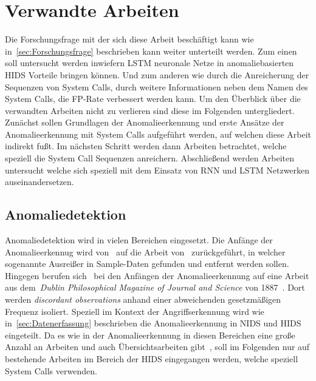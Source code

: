 \chapter{Verwandte Arbeiten}\label{ch:verwandte_arbeiten}

Die Forschungsfrage mit der sich diese Arbeit beschäftigt kann wie in~\autoref{sec:Forschungsfrage} beschrieben kann weiter unterteilt werden.
Zum einen soll untersucht werden inwiefern \ac{LSTM} neuronale Netze in anomaliebasierten \ac{HIDS} Vorteile bringen können.
Und zum anderen wie durch die Anreicherung der Sequenzen von System Calls, durch weitere Informationen neben dem Namen des System Calls, die \ac{FP}-Rate verbessert werden kann.
Um den Überblick über die verwandten Arbeiten nicht zu verlieren sind diese im Folgenden untergliedert.
Zunächst sollen Grundlagen der Anomalieerkennung und erste Ansätze der Anomalieerkennung mit System Calls aufgeführt werden, auf welchen diese Arbeit indirekt fußt.
Im nächsten Schritt werden dann Arbeiten betrachtet, welche speziell die System Call Sequenzen anreichern.
Abschließend werden Arbeiten untersucht welche sich speziell mit dem Einsatz von \ac{RNN} und \ac{LSTM} Netzwerken auseinandersetzen.

\section{Anomaliedetektion}

    Anomaliedetektion wird in vielen Bereichen eingesetzt.
    Die Anfänge der Anomalieerkennug wird von~\cite{ANOMALYBOOKKISHAN2017} auf die Arbeit von~\cite{ANOMALYDEFINITION1969} zurückgeführt, in welcher sogenannte Ausreißer in Sample-Daten gefunden und entfernt werden sollen.
    Hingegen berufen sich~\cite{ANOMALYSURVEY} bei den Anfängen der Anomalieerkennung auf eine Arbeit aus dem~\textit{Dublin Philosophical Magazine of Journal and Science} von 1887~\cite{ANOMALYDEFINITION1887}.
    Dort werden \textit{discordant observations} anhand einer abweichenden gesetzmäßigen Frequenz isoliert. 
    Speziell im Kontext der Angriffserkennung wird wie in~\autoref{sec:Datenerfassung} beschrieben die Anomalieerkennung in \ac{NIDS} und \ac{HIDS} eingeteilt.
    Da es wie in der Anomalieerkennung in diesen Bereichen eine große Anzahl an Arbeiten und auch Übersichtsarbeiten gibt~\cite{ANOMALYSURVEY, ANOMALYSURVEY3}, soll im Folgenden nur auf bestehende Arbeiten im Bereich der \ac{HIDS} eingegangen werden, welche speziell System Calls verwenden.

